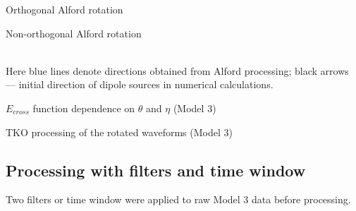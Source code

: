 \documentclass[a4paper,11pt]{article}
\begin{document}
\begin{minipage}[c]{0.47\linewidth}	
\begin{center}
		Orthogonal Alford rotation \\
\end{center}	  		
\end{minipage} 
\begin{minipage}[c]{0.47\linewidth}
\begin{center}
		Non-orthogonal Alford rotation\\
\end{center}
\end{minipage} \\
\footnotesize Here blue lines denote directions obtained from Alford processing; black arrows --- initial direction of dipole sources in numerical calculations.
\normalsize
\vspace{\baselineskip}
\vspace{\baselineskip} 

\begin{minipage}[h]{0.47\linewidth}	
\begin{center} 
$E_{cross}$ function dependence on $\theta$ and $\eta$ (Model 3)\\
			\label{fig:rot4_gs_solution}
\end{center}
\end{minipage} \hfill
\begin{minipage}[h]{0.47\linewidth}
\begin{center}
TKO processing of the rotated waveforms (Model 3)
			\\
	  		\label{fig:rot4_tko_comp}
\end{center}	  		
\end{minipage}

\newpage

\subsection*{Processing with filters and time window}

Two filters or time window were applied to raw Model 3 data before processing.
\end{document}
